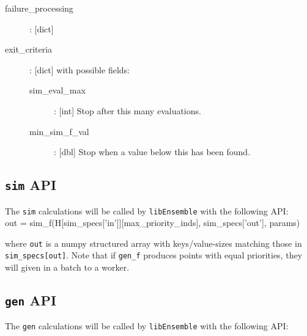 \documentclass{article}
\newenvironment{allintypewriter}{\ttfamily}{\par}
\newcommand{\libE}{\texttt{libEnsemble}\xspace}
\begin{document}
\begin{allintypewriter}
\begin{description}
    \item[failure\_processing]: [dict]

    \item[exit\_criteria]: [dict] with possible fields:
      \begin{description}
        \item[sim\_eval\_max]: [int] Stop after this many evaluations.
        \item[min\_sim\_f\_val]: [dbl] Stop when a value below this has been found.
      \end{description}


  \end{description}
\end{allintypewriter}
        

\subsection{\texttt{sim} API}
The \texttt{sim} calculations will be called by \libE with the following API:\\

\begin{allintypewriter}
  out = sim\_f(H[sim\_specs['in']][max\_priority\_inds], sim\_specs['out'],
  params)\\
\end{allintypewriter}

where \texttt{out} is a numpy structured array with keys/value-sizes matching
those in \texttt{sim\_specs[out]}. Note that if \texttt{gen\_f} produces points
with equal priorities, they will given in a batch to a worker.

\subsection{\texttt{gen} API}
The \texttt{gen} calculations will be called by \libE with the following API:\\
\end{document}
